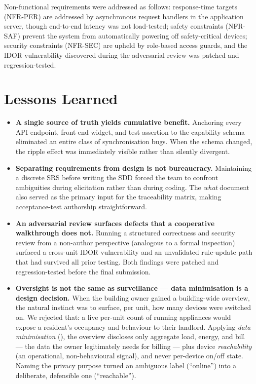 Non-functional requirements were addressed as follows: response-time targets
(NFR-PER) are addressed by asynchronous request handlers in the application
server, though end-to-end latency was not load-tested; safety constraints
(NFR-SAF) prevent the system from automatically powering off safety-critical
devices; security constraints (NFR-SEC) are upheld by role-based access guards,
and the IDOR vulnerability discovered during the adversarial review was patched
and regression-tested.

\section{Lessons Learned}

\begin{itemize}[leftmargin=1.5em, itemsep=4pt]

  \item \textbf{A single source of truth yields cumulative benefit.}
        Anchoring every API endpoint, front-end widget, and test assertion to the
        capability schema eliminated an entire class of synchronisation bugs.
        When the schema changed, the ripple effect was immediately visible
        rather than silently divergent.

  \item \textbf{Separating requirements from design is not bureaucracy.}
        Maintaining a discrete SRS before writing the SDD forced the team to
        confront ambiguities during elicitation rather than during coding.  The
        \emph{what} document also served as the primary input for the
        traceability matrix, making acceptance-test authorship straightforward.

  \item \textbf{An adversarial review surfaces defects that a cooperative walkthrough does not.}
        Running a structured correctness and security review from a
        non-author perspective (analogous to a formal inspection) surfaced a
        cross-unit IDOR vulnerability and an unvalidated rule-update path that
        had survived all prior testing.  Both findings were patched and
        regression-tested before the final submission.

  \item \textbf{Oversight is not the same as surveillance --- data minimisation is a design decision.}
        When the building owner gained a building-wide overview, the natural
        instinct was to surface, per unit, how many devices were switched on.  We
        rejected that: a live per-unit count of running appliances would expose a
        resident's occupancy and behaviour to their landlord.  Applying
        \emph{data minimisation} (), the overview discloses only
        aggregate load, energy, and bill --- the data the owner legitimately needs
        for billing --- plus device \emph{reachability} (an operational, non-behavioural
        signal), and never per-device on/off state.  Naming the privacy purpose
        turned an ambiguous label (``online'') into a deliberate, defensible one
        (``reachable'').


\end{itemize}
